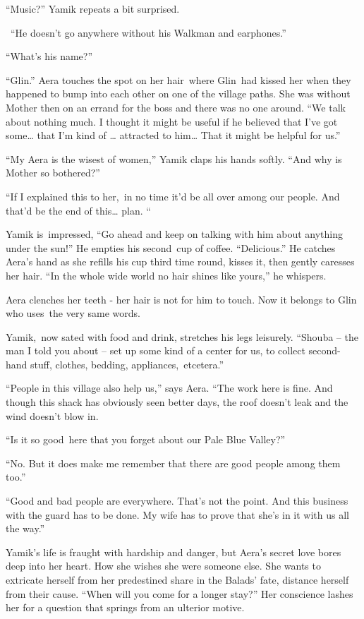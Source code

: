 \documentclass[twoside,11pt]{book}
\begin{document}
{}``Music?'' Yamik repeats a bit surprised.

~``He doesn't go anywhere without his Walkman and earphones.'' 

{}``What's his name?'' 

{}``Glin.'' Aera touches the spot on her hair~where Glin\ had kissed her when they happened to bump into each other on
one of the village paths. She was without Mother then on an errand for the boss and there was no one around. ``We talk
about nothing much. I thought it might be useful if he believed that I've got some{\dots}  that I'm kind of {\dots}
attracted to him{\dots} That it might be helpful for us.'' 

{}``My Aera is the wisest of women,'' Yamik claps his hands softly. ``And why is Mother so bothered?'' 

{}``If I explained this to her,\ in no time it'd be all over among our people. And that'd be the end of this{\dots}
plan. ``

Yamik is~impressed, ``Go ahead and keep on talking with him about anything under the sun!'' He empties his second~cup of
coffee. ``Delicious.'' He catches Aera's hand as she refills his cup third time round, kisses it, then gently caresses
her hair. {}``In the whole wide world no hair shines like yours,{}'' he whispers.

Aera clenches her teeth - her hair is not for him to touch. Now it belongs to Glin who uses\ the very same words.~ 

Yamik,\ now sated with food and drink, stretches his legs leisurely. ``Shouba -- the man I told you about -- set up some
kind of a center for us, to collect second-hand stuff, clothes, bedding, appliances,\ etcetera.'' 

{}``People in this village also help us,'' says Aera. ``The work here is fine. And though this shack has obviously seen
better days, the roof doesn't leak and the wind doesn't blow in.{\textquotedbl}

{}``Is it so good~here that you forget about our Pale Blue Valley?'' 

{}``No. But it does make me remember that there are good people among them too.'' 

{}``Good and bad people are everywhere. That's not the point. And this business with the guard has to be done. My wife
has to prove that she's in it with us all the way.''

Yamik's life is fraught with hardship and danger, but Aera's secret love bores deep into her heart. How she wishes she
were someone else. She wants to extricate herself from her predestined share in the Balads' fate, distance herself from
their cause. ``When will you come for a longer stay?'' Her conscience lashes her for a question that springs from an
ulterior motive. 
\end{document}
